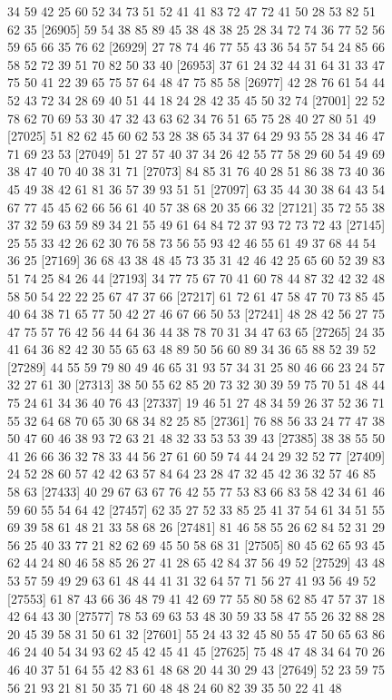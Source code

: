 \documentclass{article}
\begin{document}
\begin{figure}[H]
\begin{Schunk}
\begin{Soutput}
[26881] 34 59 42 25 60 52 34 73 51 52 41 41 83 72 47 72 41 50 28 53 82 51 62 35
[26905] 59 54 38 85 89 45 38 48 38 25 28 34 72 74 36 77 52 56 59 65 66 35 76 62
[26929] 27 78 74 46 77 55 43 36 54 57 54 24 85 66 58 52 72 39 51 70 82 50 33 40
[26953] 37 61 24 32 44 31 64 31 33 47 75 50 41 22 39 65 75 57 64 48 47 75 85 58
[26977] 42 28 76 61 54 44 52 43 72 34 28 69 40 51 44 18 24 28 42 35 45 50 32 74
[27001] 22 52 78 62 70 69 53 30 47 32 43 63 62 34 76 51 65 75 28 40 27 80 51 49
[27025] 51 82 62 45 60 62 53 28 38 65 34 37 64 29 93 55 28 34 46 47 71 69 23 53
[27049] 51 27 57 40 37 34 26 42 55 77 58 29 60 54 49 69 38 47 40 70 40 38 31 71
[27073] 84 85 31 76 40 28 51 86 38 73 40 36 45 49 38 42 61 81 36 57 39 93 51 51
[27097] 63 35 44 30 38 64 43 54 67 77 45 45 62 66 56 61 40 57 38 68 20 35 66 32
[27121] 35 72 55 38 37 32 59 63 59 89 34 21 55 49 61 64 84 72 37 93 72 73 72 43
[27145] 25 55 33 42 26 62 30 76 58 73 56 55 93 42 46 55 61 49 37 68 44 54 36 25
[27169] 36 68 43 38 48 45 73 35 31 42 46 42 25 65 60 52 39 83 51 74 25 84 26 44
[27193] 34 77 75 67 70 41 60 78 44 87 32 42 32 48 58 50 54 22 22 25 67 47 37 66
[27217] 61 72 61 47 58 47 70 73 85 45 40 64 38 71 65 77 50 42 27 46 67 66 50 53
[27241] 48 28 42 56 27 75 47 75 57 76 42 56 44 64 36 44 38 78 70 31 34 47 63 65
[27265] 24 35 41 64 36 82 42 30 55 65 63 48 89 50 56 60 89 34 36 65 88 52 39 52
[27289] 44 55 59 79 80 49 46 65 31 93 57 34 31 25 80 46 66 23 24 57 32 27 61 30
[27313] 38 50 55 62 85 20 73 32 30 39 59 75 70 51 48 44 75 24 61 34 36 40 76 43
[27337] 19 46 51 27 48 34 59 26 37 52 36 71 55 32 64 68 70 65 30 68 34 82 25 85
[27361] 76 88 56 33 24 77 47 38 50 47 60 46 38 93 72 63 21 48 32 33 53 53 39 43
[27385] 38 38 55 50 41 26 66 36 32 78 33 44 56 27 61 60 59 74 44 24 29 32 52 77
[27409] 24 52 28 60 57 42 42 63 57 84 64 23 28 47 32 45 42 36 32 57 46 85 58 63
[27433] 40 29 67 63 67 76 42 55 77 53 83 66 83 58 42 34 61 46 59 60 55 54 64 42
[27457] 62 35 27 52 33 85 25 41 37 54 61 34 51 55 69 39 58 61 48 21 33 58 68 26
[27481] 81 46 58 55 26 62 84 52 31 29 56 25 40 33 77 21 82 62 69 45 50 58 68 31
[27505] 80 45 62 65 93 45 62 44 24 80 46 58 85 26 27 41 28 65 42 84 37 56 49 52
[27529] 43 48 53 57 59 49 29 63 61 48 44 41 31 32 64 57 71 56 27 41 93 56 49 52
[27553] 61 87 43 66 36 48 79 41 42 69 77 55 80 58 62 85 47 57 37 18 42 64 43 30
[27577] 78 53 69 63 53 48 30 59 33 58 47 55 26 32 88 28 20 45 39 58 31 50 61 32
[27601] 55 24 43 32 45 80 55 47 50 65 63 86 46 24 40 54 34 93 62 45 42 45 41 45
[27625] 75 48 47 48 34 64 70 26 46 40 37 51 64 55 42 83 61 48 68 20 44 30 29 43
[27649] 52 23 59 75 56 21 93 21 81 50 35 71 60 48 48 24 60 82 39 35 50 22 41 48

\end{Soutput}
\end{Schunk}
\end{figure}
\end{document}
